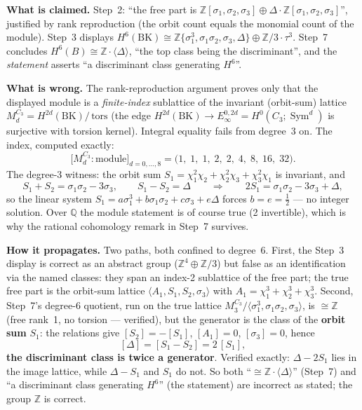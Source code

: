 \documentclass[11pt,a4paper]{article}
\newcommand{\Z}{\mathbb{Z}}
\newcommand{\Q}{\mathbb{Q}}
\newcommand{\BK}{\mathrm{BK}}
\newcommand{\tors}{\,\mathrm{tors}}
\begin{document}
\textbf{What is claimed.} Step~2: ``the free part is
$\Z[\sigma_1,\sigma_2,\sigma_3]\oplus\Delta\cdot\Z[\sigma_1,\sigma_2,
\sigma_3]$'', justified by rank reproduction (the orbit count equals the
monomial count of the module). Step~3 displays
$H^6(\BK)\cong\Z\{\sigma_1^3,\sigma_1\sigma_2,\sigma_3,\Delta\}\oplus
\Z/3\cdot\tau^3$. Step~7 concludes $H^6(B)\cong\Z\cdot\langle\Delta\rangle$,
``the top class being the discriminant'', and the \emph{statement} asserts
``a discriminant class generating $H^6$''.

\textbf{What is wrong.} The rank-reproduction argument proves only that the
displayed module is a \emph{finite-index} sublattice of the invariant
(orbit-sum) lattice $M_d^{C_3}=H^{2d}(\BK)/\tors$ (the edge
$H^{2d}(\BK)\to E_\infty^{0,2d}=H^0(C_3;\operatorname{Sym}^d)$ is surjective
with torsion kernel). Integral equality fails from degree~3 on. The index,
computed exactly:
\[
\bigl[M_d^{C_3}:\text{module}\bigr]_{d=0,\dots,8}
=\bigl(1,\;1,\;1,\;2,\;2,\;4,\;8,\;16,\;32\bigr).
\]
The degree-3 witness: the orbit sum
$S_1=\chi_1^2\chi_2+\chi_2^2\chi_3+\chi_3^2\chi_1$ is invariant, and
\[
S_1+S_2=\sigma_1\sigma_2-3\sigma_3,\qquad
S_1-S_2=\Delta\qquad\Longrightarrow\qquad
2S_1=\sigma_1\sigma_2-3\sigma_3+\Delta,
\]
so the linear system $S_1=a\sigma_1^3+b\sigma_1\sigma_2+c\sigma_3+e\Delta$
forces $b=e=\tfrac12$ --- no integer solution. Over $\Q$ the module statement
is of course true (2 invertible), which is why the rational cohomology
remark in Step~7 survives.

\textbf{How it propagates.} Two paths, both confined to degree~6. First, the
Step~3 display is correct as an abstract group ($\Z^4\oplus\Z/3$) but false
as an identification via the named classes: they span an index-2 sublattice
of the free part; the true free part is the orbit-sum lattice
$\langle A_1,S_1,S_2,\sigma_3\rangle$ with
$A_1=\chi_1^3+\chi_2^3+\chi_3^3$. Second, Step~7's degree-6 quotient, run on
the true lattice $M_3^{C_3}/\langle\sigma_1^3,\sigma_1\sigma_2,\sigma_3
\rangle$, is $\cong\Z$ (free rank~1, no torsion --- verified), but the
generator is the class of the \textbf{orbit sum} $S_1$: the relations give
$[S_2]=-[S_1]$, $[A_1]=0$, $[\sigma_3]=0$, hence
\[
[\Delta]=[S_1-S_2]=2\,[S_1],
\]
\textbf{the discriminant class is twice a generator}. Verified exactly:
$\Delta-2S_1$ lies in the image lattice, while $\Delta-S_1$ and $S_1$ do not.
So both ``$\cong\Z\cdot\langle\Delta\rangle$'' (Step~7) and ``a discriminant
class generating $H^6$'' (the statement) are incorrect as stated; the group
$\Z$ is correct.
\end{document}
